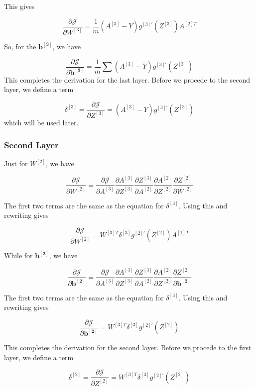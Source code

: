 \documentclass[12pt]{article}
\begin{document}
This gives

$$
    \frac{\partial{\mathcal{J}}}{\partial W^{[3]}} = \frac{1}{m} \left(A^{[3]} - Y \right) g^{[3]'}(Z^{[3]}) A^{[2] T}
$$

So, for the $\mathbf{b^{[3]}}$, we have

$$
    \frac{\partial{\mathcal{J}}}{\partial \mathbf{b^{[3]}}} = \frac{1}{m} \sum \left(A^{[3]} - Y \right) g^{[3]'}(Z^{[3]})
$$
This completes the derivation for the last layer. Before we procede to the second layer, we define a term

$$
    \delta^{[3]} = \frac{\partial{\mathcal{J}}}{\partial Z^{[3]}} = \left(A^{[3]} - Y \right) g^{[3]'}(Z^{[3]})
$$ which will be used later.

\subsubsection{Second Layer}
Just for $W^{[2]}$, we have

$$
    \frac{\partial{\mathcal{J}}}{\partial W^{[2]}} = \frac{\partial{\mathcal{J}}}{\partial A^{[3]}} \frac{\partial A^{[3]}}{\partial Z^{[3]}} \frac{\partial Z^{[3]}}{\partial A^{[2]}} \frac{\partial A^{[2]}}{\partial Z^{[2]}} \frac{\partial Z^{[2]}}{\partial W^{[2]}}
$$

The first two terms are the same as the equation for $\delta^{[3]}$. Using this and rewriting gives

$$
    \frac{\partial{\mathcal{J}}}{\partial W^{[2]}} =  W^{[3]T} \delta^{[3]} g^{[2]'}(Z^{[2]}) A^{[1]T}
$$

While for $\mathbf{b^{[2]}}$, we have

$$
    \frac{\partial{\mathcal{J}}}{\partial \mathbf{b^{[2]}}} = \frac{\partial{\mathcal{J}}}{\partial A^{[3]}} \frac{\partial A^{[3]}}{\partial Z^{[3]}} \frac{\partial Z^{[3]}}{\partial A^{[2]}} \frac{\partial A^{[2]}}{\partial Z^{[2]}} \frac{\partial Z^{[2]}}{\partial \mathbf{b^{[2]}}}
$$

The first two terms are the same as the equation for $\delta^{[3]}$. Using this and rewriting gives

$$
    \frac{\partial{\mathcal{J}}}{\partial \mathbf{b^{[2]}}} =  W^{[3]T} \delta^{[3]} g^{[2]'}(Z^{[2]})
$$

This completes the derivation for the second layer. Before we procede to the first layer, we define a term

$$
    \delta^{[2]} = \frac{\partial{\mathcal{J}}}{\partial Z^{[2]}} = W^{[3]T} \delta^{[3]} g^{[2]'}(Z^{[2]})
$$
\end{document}

